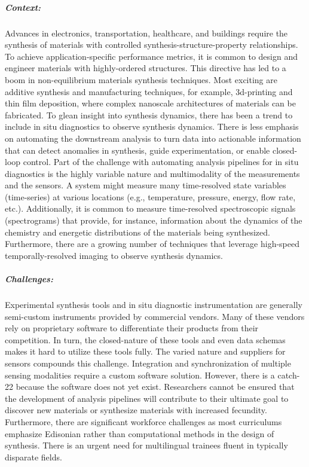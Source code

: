 \subparagraph*{Context:} Advances in electronics, transportation, healthcare, and buildings require the synthesis of materials with controlled synthesis-structure-property relationships. To achieve application-specific performance metrics, it is common to design and engineer materials with highly-ordered structures. This directive has led to a boom in non-equilibrium materials synthesis techniques. Most exciting are additive synthesis and manufacturing techniques, for example, 3d-printing\cite{Wang2020-tv,Parekh2016-vj,Visser2015-hy,Ligon2017-dg,Zarek2016-dw} and thin film deposition\cite{Chrisey1994-gw,Richter1990-ml,Yoshino2000-oo,Kelly2000-xk,Marvel2013-cd,George2010-pb,Park2001-so}, where complex nanoscale architectures of materials can be fabricated. To glean insight into synthesis dynamics, there has been a trend to include in situ diagnostics to observe synthesis dynamics\cite{Ojeda-G-P2017-la,Egelhoff1989-pr,Thomas1999-ij,Langereis2007-dj}. There is less emphasis  on automating the downstream analysis to turn data into actionable information that can detect anomalies in synthesis, guide experimentation, or enable closed-loop control. Part of the challenge with automating analysis pipelines for in situ diagnostics is the highly variable nature and multimodality of the measurements and the sensors. A system might measure many time-resolved state variables (time-series) at various locations (e.g., temperature, pressure, energy, flow rate, etc.)\cite{Hansen1999-an}. Additionally, it is common to measure time-resolved spectroscopic signals (spectrograms) that provide, for instance, information about the dynamics of the chemistry and energetic distributions of the materials being synthesized\cite{Cooks2018-jm,Termopoli2019-gb,Dauchot1995-cu,Aubriet2002-ln}. Furthermore, there are a growing number of techniques that leverage high-speed temporally-resolved imaging to observe synthesis dynamics\cite{Trigub2017-xw,Ojeda-G-P2018-cv}.

        
\subparagraph*{Challenges:} Experimental synthesis tools and in situ diagnostic instrumentation are generally semi-custom instruments provided by commercial vendors. Many of these vendors rely on proprietary software to differentiate their products from their competition. In turn, the closed-nature of these tools and even data schemas makes it hard to utilize these tools fully. The varied nature and suppliers for sensors compounds this challenge. Integration and synchronization of multiple sensing modalities require a custom software solution. However, there is a catch-22 because the software does not yet exist. Researchers cannot be ensured that the development of analysis pipelines will contribute to their ultimate goal to discover new materials or synthesize materials with increased fecundity. Furthermore, there are significant workforce challenges as most curriculums emphasize Edisonian rather than computational methods in the design of synthesis. There is an urgent need for multilingual trainees fluent in typically disparate fields. 

